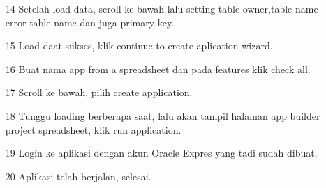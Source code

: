 \begin{enumerate}
\item[14] Setelah load data, scroll ke bawah lalu setting table owner,table name error table name dan juga primary key.

\item[15] Load daat sukses, klik continue to create aplication wizard.

\item[16] Buat nama app from a spreadsheet dan pada features klik check all.

\item[17] Scroll ke bawah, pilih create application.

\item[18] Tunggu loading berberapa saat, lalu akan tampil halaman app builder project spreadsheet, klik run application.

\item[19] Login ke aplikasi dengan akun Oracle Expres yang tadi sudah dibuat.

\item[20] Aplikasi telah berjalan, selesai.
\end{enumerate}


